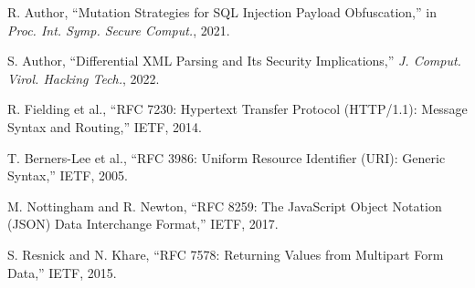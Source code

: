 R. Author, ``Mutation Strategies for SQL Injection Payload Obfuscation,'' in \emph{Proc. Int. Symp. Secure Comput.}, 2021.

S. Author, ``Differential XML Parsing and Its Security Implications,'' \emph{J. Comput. Virol. Hacking Tech.}, 2022.

R. Fielding et al., ``RFC 7230: Hypertext Transfer Protocol (HTTP/1.1): Message Syntax and Routing,'' IETF, 2014.

T. Berners-Lee et al., ``RFC 3986: Uniform Resource Identifier (URI): Generic Syntax,'' IETF, 2005.

M. Nottingham and R. Newton, ``RFC 8259: The JavaScript Object Notation (JSON) Data Interchange Format,'' IETF, 2017.

S. Resnick and N. Khare, ``RFC 7578: Returning Values from Multipart Form Data,'' IETF, 2015.

